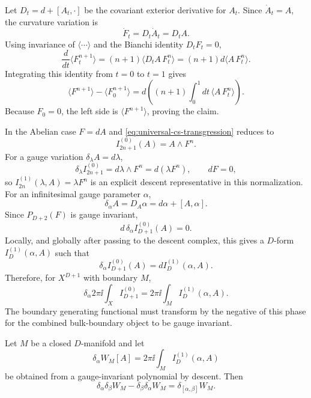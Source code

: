 Let \(D_t=d+[A_t,\cdot]\) be the covariant exterior derivative for \(A_t\).
Since \(\dot A_t=A\), the curvature variation is
\[
  \dot F_t=D_t\dot A_t=D_tA .
\]
Using invariance of \(\langle\cdots\rangle\) and the Bianchi identity
\(D_tF_t=0\),
\[
  \frac{d}{dt}\langle F_t^{n+1}\rangle
  =
  (n+1)\langle D_tA\,F_t^n\rangle
  =
  (n+1)d\langle A\,F_t^n\rangle .
\]
Integrating this identity from \(t=0\) to \(t=1\) gives
\[
  \langle F^{n+1}\rangle-\langle F_0^{n+1}\rangle
  =
  d\left((n+1)\int_0^1dt\,\langle A\,F_t^n\rangle\right).
\]
Because \(F_0=0\), the left side is \(\langle F^{n+1}\rangle\), proving the
claim.

In the Abelian case \(F=dA\) and \eqref{eq:universal-cs-transgression}
reduces to
\[
  I_{2n+1}^{(0)}(A)=A\wedge F^n .
\]
For a gauge variation \(\delta_\lambda A=d\lambda\),
\[
  \delta_\lambda I_{2n+1}^{(0)}
  =
  d\lambda\wedge F^n
  =
  d(\lambda F^n),
  \qquad dF=0,
\]
so \(I_{2n}^{(1)}(\lambda,A)=\lambda F^n\) is an explicit descent
representative in this normalization.
For an infinitesimal gauge parameter \(\alpha\),
\[
  \delta_\alpha A=D_A\alpha=d\alpha+[A,\alpha].
\]
Since \(P_{D+2}(F)\) is gauge invariant,
\[
  d\,\delta_\alpha I_{D+1}^{(0)}(A)=0.
\]
Locally, and globally after passing to the descent complex, this gives a
\(D\)-form \(I_D^{(1)}(\alpha,A)\) such that
\[
  \delta_\alpha I_{D+1}^{(0)}(A)=dI_D^{(1)}(\alpha,A).
\]
Therefore, for \(X^{D+1}\) with boundary \(M\),
\[
  \delta_\alpha
  2\pi\ii\int_X I_{D+1}^{(0)}
  =
  2\pi\ii\int_M I_D^{(1)}(\alpha,A).
\]
The boundary generating functional must transform by the negative of this
phase for the combined bulk-boundary object to be gauge invariant.

\begin{proposition}
\label{prop:wess-zumino-consistency-from-descent}
Let \(M\) be a closed \(D\)-manifold and let
\[
  \delta_\alpha W_M[A]
  =
  2\pi\ii\int_M I_D^{(1)}(\alpha,A)
\]
be obtained from a gauge-invariant polynomial by descent.  Then
\[
  \delta_\alpha\delta_\beta W_M
  -
  \delta_\beta\delta_\alpha W_M
  =
  \delta_{[\alpha,\beta]}W_M .
\]
\end{proposition}

